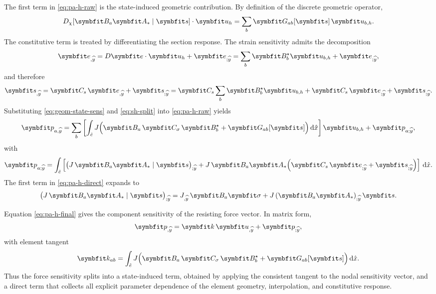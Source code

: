 The first term in \eqref{eq:pa-h-raw} is the state-induced geometric contribution. 
By definition of the discrete geometric operator,
\begin{equation}
D_\chi[\bm{B}_a\bm{A}_*\mid\bm{s}] \cdot \bm{u}_h
=
\sum_b \bm{G}_{ab}[\bm{s}]\,\ModelState_{b,h}.
\label{eq:geom-state-sens}
\end{equation}
The constitutive term is treated by differentiating the section response. The strain sensitivity admits the decomposition
\begin{equation}
\bm{e}_{,\HostParameter}
=
D\bm{e}\cdot \bm{u}_h + \bm{e}_{;\HostParameter}
=
\sum_b \bm{B}_b^\star \ModelState_{b,h} + \bm{e}_{;\HostParameter},
\label{eq:eh-split}
\end{equation}
and therefore
\begin{equation}
\bm{s}_{,\HostParameter}
=
\bm{C}_s\,\bm{e}_{,\HostParameter} + \bm{s}_{;\HostParameter}
=
\bm{C}_s\sum_b \bm{B}_b^\star \ModelState_{b,h}
+
\bm{C}_s\,\bm{e}_{;\HostParameter}
+
\bm{s}_{;\HostParameter}.
\label{eq:sh-split}
\end{equation}
Substituting \eqref{eq:geom-state-sens} and \eqref{eq:sh-split} into \eqref{eq:pa-h-raw} yields
\begin{equation}
\bm{p}_{a,\HostParameter}
=
\sum_b
\left[
\int_{\hat e}
J\Bigl(
\bm{B}_a\,\bm{C}_\sigma\,\bm{B}_b^\star
+
\bm{G}_{ab}[\bm{s}]
\Bigr)\,\dd\hat{\reflenx}
\right]\ModelState_{b,h}
+
\bm{p}_{a;\HostParameter},
\label{eq:pa-h-final}
\end{equation}
with
\begin{equation}
\bm{p}_{a;\HostParameter}
=
\int_{\hat e}
\left[
\bigl(J\,\bm{B}_a\bm{A}_*\mid\bm{s}\bigr)_{;\HostParameter}
+
J\,\bm{B}_a\bm{A}_*
\Bigl(
\bm{C}_s\,\bm{e}_{;\HostParameter}
+
\bm{s}_{;\HostParameter}
\Bigr)
\right]\,\dd\hat{\reflenx} .
\label{eq:pa-h-direct}
\end{equation}
The first term in \eqref{eq:pa-h-direct} expands to
\begin{equation}
\bigl(J\,\bm{B}_a\bm{A}_*\mid\bm{s}\bigr)_{;\HostParameter}
=
J_{,\HostParameter}\,\bm{B}_a\bm{\sigma}
+
J\,(\bm{B}_a\bm{A}_*)_{;\HostParameter}\,\bm{s}.
\label{eq:pa-h-direct-expand}
\end{equation}

Equation \eqref{eq:pa-h-final} gives the component sensitivity of the resisting force vector. In matrix form,
\begin{equation}
\bm{p}_{,\HostParameter}
=
\bm{k}\,\ModelState_{,\HostParameter}
+
\bm{p}_{;\HostParameter},
\label{eq:p-h-matrix}
\end{equation}
with element tangent
\begin{equation}
\bm{k}_{ab}
=
\int_{\hat e}
J\Bigl(
\bm{B}_a\,\bm{C}_\sigma\,\bm{B}_b^\star
+
\bm{G}_{ab}[\bm{s}]
\Bigr)\,\dd\hat{\reflenx} .
\label{eq:k-ab-sens}
\end{equation}
Thus the force sensitivity splits into a state-induced term, obtained by applying the consistent tangent to the nodal sensitivity vector, and a direct term that collects all explicit parameter dependence of the element geometry, interpolation, and constitutive response.

